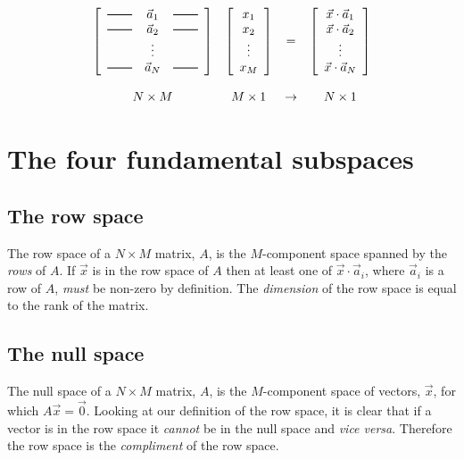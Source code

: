 \documentclass[a4paper]{article}
\newcommand{\hmatrixrule}{\rule[0.5ex]{2em}{0.7pt}}
\newcommand{\highlight}[1]{{\color{blue}#1}}
\begin{document}
\[
\begin{array}{cccc}
\left[
	\begin{array}{ccc}
		\hmatrixrule & \vec{a}_1 & \hmatrixrule \\
		\hmatrixrule & \vec{a}_2 & \hmatrixrule \\
		            & \vdots & \\
		\hmatrixrule & \vec{a}_N & \hmatrixrule
	\end{array}
\right] &
\left[
	\begin{array}{c}
		x_1 \\ x_2 \\ \vdots \\ x_M
	\end{array}
\right] &
= &
\left[
	\begin{array}{c}
		\vec{x} \cdot \vec{a}_1 \\ \vec{x} \cdot \vec{a}_2 \\ \vdots \\ \vec{x} \cdot \vec{a}_N
	\end{array}
\right]
\\
\rule{0pt}{2em} N \times M & M \times 1 & \rightarrow & N \times 1
\end{array}
\]

\section{The four fundamental subspaces}

\subsection{The row space}

The row space of a $N \times M$ matrix, $A$, is \highlight{the $M$-component space
spanned by the \emph{rows} of $A$}. If $\vec{x}$ is in the row space of $A$
then at least one of $\vec{x} \cdot \vec{a}_i$, where $\vec{a}_i$ is a row of
$A$, \emph{must} be non-zero by definition. \highlight{The \emph{dimension} of the row
space is equal to the rank of the matrix.}

\subsection{The null space}

The null space of a $N \times M$ matrix, $A$, is the \highlight{$M$-component} space of
vectors, $\vec{x}$, for which \highlight{$A\vec{x} = \vec{0}$}. Looking at our
definition of the row space, it is clear that if a vector is in the row space
it \emph{cannot} be in the null space and \emph{vice versa}. Therefore the row
space is the \emph{compliment} of the row space.
\end{document}
